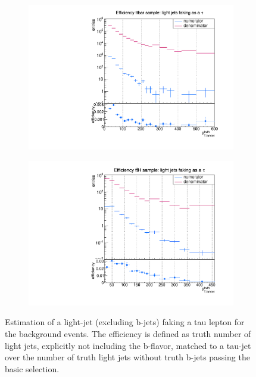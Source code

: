 \begin{figure}
  \centering
                \begin{subfigure}[t]{0.49\textwidth}
                \includegraphics[width=\textwidth]{figures/plots/ttbar/Divided_NoBjet.pdf}
                \label{DividedNoBjet:bg:ttbar}
                \end{subfigure}
                \begin{subfigure}[t]{0.49\textwidth}
                \includegraphics[width=\textwidth]{figures/plots/ttH/Divided_NoBjet.pdf}
                \label{DividedNoBjet:bg:ttH}
                \end{subfigure}
\caption[Estimation of a light-jet faking a tau lepton for the background events.]{Estimation of a light-jet (excluding b-jets) faking a tau lepton for the background events. The efficiency is defined as truth number of light jets, explicitly not including the b-flavor, matched to a tau-jet over the number of truth light jets without truth b-jets passing the basic selection.}
\label{DividedNoBjet:bg}
\end{figure}
